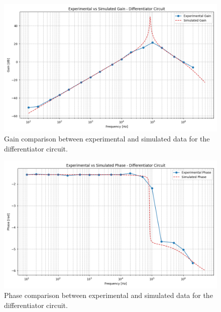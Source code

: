		\begin{figure}[H]
		    \centering
		    \includegraphics[width=1\textwidth]{figures/differentiator/gain_plot.png}
		    \caption{Gain comparison between experimental and simulated data for the differentiator circuit.}
		    \label{fig:differentiator_gain}
		\end{figure}

		\begin{figure}[H]
		    \centering
		    \includegraphics[width=1\textwidth]{figures/differentiator/phase_plot.png}
		    \caption{Phase comparison between experimental and simulated data for the differentiator circuit.}
		    \label{fig:differentiator_phase}
		\end{figure}

